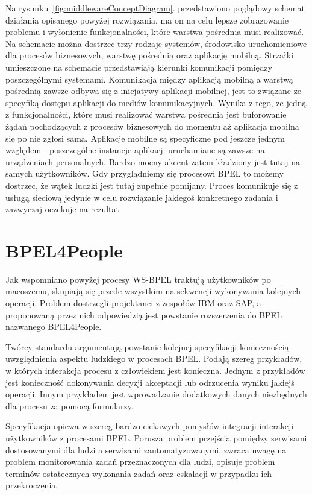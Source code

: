 Na rysunku~\ref{fig:middlewareConceptDiagram}. przedstawiono poglądowy schemat działania opisanego powyżej rozwiązania, ma on na celu lepsze zobrazowanie problemu i wyłonienie funkcjonalności, które warstwa pośrednia musi realizować. Na schemacie można dostrzec trzy rodzaje systemów, środowisko uruchomieniowe dla procesów biznesowych, warstwę pośrednią oraz aplikację mobilną. Strzałki umieszczone na schemacie przedstawiają kierunki komunikacji pomiędzy poszczególnymi systemami.  Komunikacja między aplikacją mobilną a warstwą pośrednią zawsze odbywa się z inicjatywy aplikacji mobilnej, jest to związane ze specyfiką dostępu aplikacji do mediów komunikacyjnych.  Wynika z tego, że jedną z funkcjonalności, które musi  realizować warstwa pośrednia jest buforowanie żądań pochodzących z procesów biznesowych do momentu aż aplikacja mobilna się po nie zgłosi sama. 
Aplikacje mobilne są specyficzne pod jeszcze jednym względem - poszczególne instancje aplikacji uruchamiane są zawsze na urządzeniach personalnych. Bardzo mocny akcent zatem kładziony jest tutaj na samych użytkowników. Gdy przyglądniemy się procesowi BPEL to możemy dostrzec, że wątek ludzki jest  tutaj zupełnie pomijany. Proces komunikuje się z usługą sieciową jedynie w celu rozwiązanie jakiegoś konkretnego zadania i zazwyczaj oczekuje na rezultat


\section{BPEL4People}
\label{sec:BPEL4People}

Jak wspomniano powyżej procesy WS-BPEL traktują użytkowników po macoszemu, skupiają się przede wszystkim na sekwencji wykonywania kolejnych operacji. Problem dostrzegli projektanci z zespołów IBM oraz SAP, a proponowaną przez nich odpowiedzią jest powstanie rozszerzenia do BPEL nazwanego BPEL4People.  

Twórcy standardu argumentują powstanie kolejnej specyfikacji koniecznością uwzględnienia aspektu ludzkiego w procesach BPEL. Podają szereg przykładów, w których interakcja procesu z człowiekiem jest konieczna. Jednym z przykładów jest konieczność dokonywania decyzji akceptacji lub odrzucenia wyniku jakiejś operacji. Innym przykładem jest wprowadzanie dodatkowych danych niezbędnych dla procesu za pomocą formularzy. \cite[str. 4]{bpel4People}

Specyfikacja opiewa w szereg bardzo ciekawych pomysłów integracji interakcji użytkowników z  procesami BPEL. Porusza problem przejścia pomiędzy serwisami dostosowanymi dla ludzi a serwisami zautomatyzowanymi, zwraca uwagę na  problem monitorowania zadań przeznaczonych dla ludzi, opisuje problem terminów ostatecznych wykonania zadań oraz eskalacji w przypadku ich przekroczenia.\cite[str. 6]{bpel4People}

